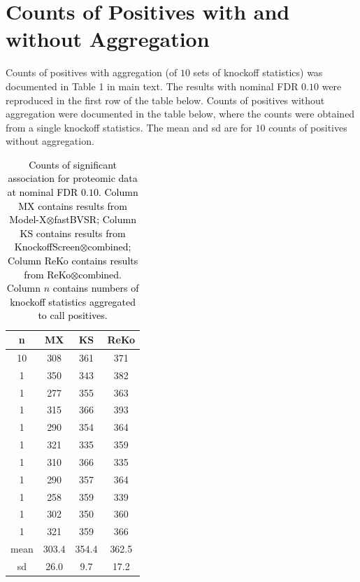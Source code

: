 \documentclass[12pt,Times]{article}
\def\tcb{\textcolor{black}}
\begin{document}
\section{Counts of Positives with and without Aggregation}
Counts of positives with aggregation (of $10$ sets of knockoff statistics) was documented in 
 Table 1 in main text. The results with nominal FDR $0.10$ were reproduced in the first row of the table below.   Counts of positives without aggregation were documented in the table below, where the counts were obtained from a single knockoff statistics. The mean and sd are for $10$ counts of positives without aggregation.  
\begin{table}[H]
\begin{center}
\begin{tabular}{cccc}
n &MX &   KS & ReKo \\
\hline
10 &308 & 361 & 371  \\
\hline 
1&350 & 343 & 382 \\
1&277 & 355 & 363 \\
1&315 & 366 & 393 \\
1&290 & 354 & 364 \\
1 & 321 & 335 & 359 \\
1 & 310 & 366 & 335 \\
1 & 290 & 357 & 364 \\
1 & 258 & 359 & 339 \\
1 & 302 & 350 & 360 \\
1 & 321 & 359 & 366 \\
\hline 
mean & 303.4 & 354.4 & 362.5 \\
sd & 26.0 & 9.7 & 17.2 \\
\hline
\end{tabular}
\end{center}
\vspace{-0.1in}
\caption{\tcb{Counts of significant association for proteomic data at nominal FDR $0.10$. Column MX contains results from Model-X\allowbreak$\otimes$fastBVSR; Column KS contains results from KnockoffScreen\allowbreak$\otimes$combined; Column ReKo contains results from ReKo\allowbreak$\otimes$combined. Column $n$ contains numbers of knockoff statistics aggregated to call positives.}}
\label{combined}
\vspace{-0.1in}
\end{table}%


\newpage
\end{document}
